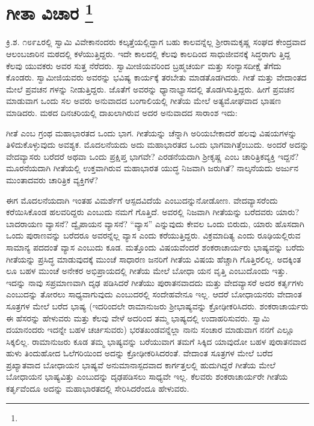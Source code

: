 
\chapter[ಗೀತಾ ವಿಚಾರ ]{ಗೀತಾ ವಿಚಾರ \protect\footnote{}}

ಕ್ರಿ.ಶ. ೧೮೯೭ರಲ್ಲಿ ಸ್ವಾಮಿ ವಿವೇಕಾನಂದರು ಕಲ್ಕತ್ತೆಯಲ್ಲಿದ್ದಾಗ ಬಹು ಕಾಲವನ್ನೆಲ್ಲ ಶ‍್ರೀರಾಮಕೃಷ್ಣ ಸಂಘದ ಕೇಂದ್ರವಾದ ಆಲಂಬಜಾರಿನ ಮಠದಲ್ಲಿ ಕಳೆಯುತ್ತಿದ್ದರು. ಇದೇ ಕಾಲದಲ್ಲಿ ಕೆಲವು ಕಾಲದಿಂದ ಸಾಧುಜೀವನಕ್ಕೆ ಸಿದ್ಧರಾಗು ತ್ತಿದ್ದ ಕೆಲವು ಯುವಕರು ಅವರ ಸುತ್ತ ನೆರೆದರು. ಸ್ವಾಮೀಜಿಯವರಿಂದ ಬ್ರಹ್ಮಚರ್ಯ ಮತ್ತು ಸಂನ್ಯಾಸದೀಕ್ಷೆ ತೆಗೆದು ಕೊಂಡರು. ಸ್ವಾಮೀಜಿಯವರು ಅವರನ್ನು ಭವಿಷ್ಯ ಕಾರ್ಯಕ್ಕೆ ತರಬೇತು ಮಾಡತೊಡಗಿದರು. ಗೀತೆ ಮತ್ತು ವೇದಾಂತದ ಮೇಲೆ ಪ್ರವಚನ ಗಳನ್ನು ನೀಡುತ್ತಿದ್ದರು. ಜೊತೆಗೆ ಅವರನ್ನು ಧ್ಯಾನಾಭ್ಯಾಸದಲ್ಲಿ ತೊಡಗಿಸುತ್ತಿದ್ದರು. ಹೀಗೆ ಪ್ರವಚನ ಮಾಡುವಾಗ ಒಂದು ಸಲ ಅವರು ಅನುವಾದದ ಬಂಗಾಲಿಯಲ್ಲಿ ಗೀತೆಯ ಮೇಲೆ ಅತ್ಯಮೋಘವಾದ ಭಾಷಣ ಮಾಡಿದರು. ಮಠದ ದಿನಚರಿಯಲ್ಲಿ ದಾಖಲಾಗಿರುವ ಅದರ ಅನುವಾದದ ಸಾರಾಂಶ ಇದು:

ಗೀತೆ ಎಂಬ ಗ್ರಂಥ ಮಹಾಭಾರತದ ಒಂದು ಭಾಗ. ಗೀತೆಯನ್ನು ಚೆನ್ನಾಗಿ ಅರಿಯಬೇಕಾದರೆ ಹಲವು ವಿಷಯಗಳನ್ನು ತಿಳಿದುಕೊಳ್ಳುವುದು ಅವಶ್ಯಕ. ಮೊದಲನೆಯದು ಅದು ಮಹಾಭಾರತದ ಒಂದು ಭಾಗವಾಗಿತ್ತೆಂಬುದು. ಅಂದರೆ ಅದನ್ನು ವೇದವ್ಯಾಸರು ಬರೆದರೆ ಅಥವಾ ಒಂದು ಪ್ರಕ್ಷಿಪ್ತ ಭಾಗವೇ? ಎರಡನೆಯದಾಗಿ ಶ‍್ರೀಕೃಷ್ಣ ಎಂಬ ಚಾರಿತ್ರಿಕವ್ಯಕ್ತಿ ಇದ್ದನೆ? ಮೂರನೆಯದಾಗಿ ಗೀತೆಯಲ್ಲಿ ಉಕ್ತವಾಗಿರುವ ಮಹಾಭಾರತ ಯುದ್ಧ ನಿಜವಾಗಿ ಜರುಗಿತೆ? ನಾಲ್ಕನೆಯದು ಅರ್ಜುನ ಮುಂತಾದವರು ಚಾರಿತ್ರಿಕ ವ್ಯಕ್ತಿಗಳೆ?

ಈಗ ಮೊದಲನೆಯದಾಗಿ ಇಂತಹ ವಿಮರ್ಶೆಗೆ ಆಸ್ಪದವಿದೆಯೆ ಎಂಬುದನ್ನು\break ನೋಡೋಣ. ವೇದವ್ಯಾಸರೆಂದು ಕರೆಯಿಸಿಕೊಂಡ ಹಲವರಿದ್ದರು ಎಂಬುದು ನಮಗೆ ಗೊತ್ತಿದೆ. ಅವರಲ್ಲಿ ನಿಜವಾಗಿ ಗೀತೆಯನ್ನು ಬರೆದವರು ಯಾರು? ಬಾದರಾಯಣ ವ್ಯಾಸನೆ? ದ್ವೈಪಾಯನ ವ್ಯಾಸನೆ? “ವ್ಯಾಸ” ಎನ್ನುವುದು ಕೇವಲ ಒಂದು ಬಿರುದು, ಯಾರು ಹೊಸದಾಗಿ ಒಂದು ಪುರಾಣವನ್ನು ಬರೆದರೂ ಅವರನ್ನೆಲ್ಲ ವ್ಯಾಸ ಎಂದು ಕರೆಯು\-ತ್ತಿದ್ದರು. ವಿಕ್ರಮಾದಿತ್ಯ ಎಂದು ರೂಢಿಯಲ್ಲಿರುವ ಸಾಮಾನ್ಯ ಪದದಂತೆ ವ್ಯಾಸ ಎಂಬುದು ಕೂಡ. ಮತ್ತೊಂದು ವಿಷಯವೆಂದರೆ ಶಂಕರಾಚಾರ್ಯರು ಭಾಷ್ಯವನ್ನು ಬರೆದು ಗೀತೆಯನ್ನು ಪ್ರಸಿದ್ಧ ಮಾಡುವುದಕ್ಕೆ ಮುಂಚೆ ಸಾಧಾರಣ ಜನರಿಗೆ ಗೀತೆಯ ವಿಷಯ ಹೆಚ್ಚಾಗಿ ಗೊತ್ತಿರಲಿಲ್ಲ. ಅದಕ್ಕಿಂತ ಲೂ ಬಹಳ ಮುಂಚೆ ಅನೇಕರ ಅಭಿಪ್ರಾಯದಲ್ಲಿ ಗೀತೆಯ ಮೇಲೆ ಬೋಧಾ ಯನ ವೃತ್ತಿ ಎಂಬುದೊಂದು ಇತ್ತು. ಇದನ್ನು ನಾವು ಸಪ್ರಮಾಣವಾಗಿ ದೃಢ ಪಡಿಸಿದರೆ ಗೀತೆಯು ಪುರಾತನವಾದದು ಮತ್ತು ವೇದವ್ಯಾಸರೆ ಅದರ ಕರ್ತೃಗಳು ಎಂಬುದನ್ನು ತೋರಲು ಸಾಧ್ಯವಾಗುವುದು ಎಂಬುದರಲ್ಲಿ ಸಂದೇಹವೇನೂ ಇಲ್ಲ. ಆದರೆ ಬೋಧಾಯನರು ವೇದಾಂತ ಸೂತ್ರಗಳ ಮೇಲೆ ಬರೆದ ಭಾಷ್ಯ (ಇದರಿಂದಲೇ ರಾಮಾನುಜರು ಶ‍್ರೀಭಾಷ್ಯವನ್ನು ಕ್ರೋಢೀಕರಿಸಿದರು. ಶಂಕರಾಚಾರ್ಯರು ಈ ಹೆಸರನ್ನು ಹೇಳುವರು ಮತ್ತು ಕೆಲವು ವೇಳೆ ಅದರಿಂದ ತಮ್ಮ ಭಾಷ್ಯದಲ್ಲಿ ಉದಾಹರಿಸುವರು. ಸ್ವಾಮಿ ದಯಾನಂದರು ಇದನ್ನೇ ಬಹಳ ಚರ್ಚಿಸುವರು) ಭರತಖಂಡವನ್ನೆಲ್ಲಾ ನಾನು ಸಂಚಾರ ಮಾಡುವಾಗ ನನಗೆ ಎಲ್ಲೂ ಸಿಕ್ಕಲಿಲ್ಲ. ರಾಮಾನುಜರು ಕೂಡ ತಮ್ಮ ಭಾಷ್ಯವನ್ನು ಬರೆಯುವಾಗ ತಮಗೆ ಸಿಕ್ಕಿದ ಯಾವುದೋ ಬಹಳ ಪುರಾತನವಾದ ಹುಳು ತಿಂದುಹೋದ ಓಲೆಗರಿಯಿಂದ ಅದನ್ನು ಕ್ರೋಢೀಕರಿಸಿದರಂತೆ. ವೇದಾಂತ ಸೂತ್ರಗಳ ಮೇಲೆ ಬರೆದ ಪ್ರಖ್ಯಾತವಾದ ಬೋಧಾಯನ ಭಾಷ್ಯವೆ ಅನುಮಾನಾಸ್ಪದವಾದ ಕಾರ್ಗತ್ತಲಲ್ಲಿ ಹುದುಗಿದ್ದರೆ ಗೀತೆಯ ಮೇಲೆ ಬೋಧಾಯನ ಭಾಷ್ಯವಿತ್ತು ಎಂಬುದನ್ನು ದೃಢಪಡಿಸಲು ಸಾಧ್ಯವೇ ಇಲ್ಲ. ಕೆಲವರು ಶಂಕರಾಚಾರ್ಯರೇ ಗೀತೆಯ ಕರ್ತೃವೆಂದೂ ಅದನ್ನು ಮಹಾಭಾರತದಲ್ಲಿ ಸೇರಿಸಿದರೆಂದೂ ಹೇಳುವರು.

